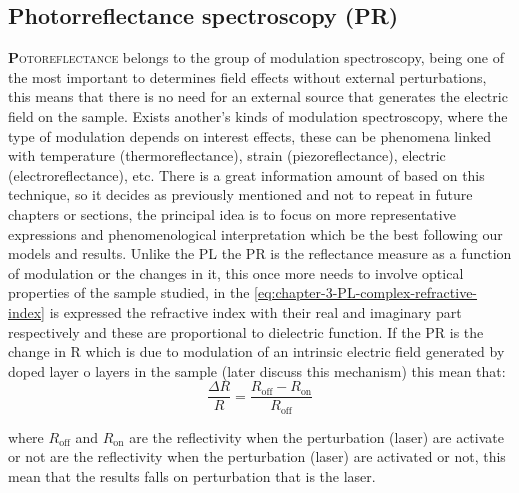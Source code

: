 \subsection{Photorreflectance spectroscopy (PR)}
\label{subsec:chapter-3-pr}
\vspace{-10mm} 
\lettrine[lines=3, lraise=.1, nindent=0mm, slope=0mm]{\textbf{P}}{otoreflectance} belongs to the group of modulation spectroscopy, being one of the most important to determines field effects without external perturbations, this means that there is no need for an external source that generates the electric field on the sample. Exists another's kinds of modulation spectroscopy, where the type of modulation depends on interest effects, these can be phenomena linked with temperature (thermoreflectance), strain (piezoreflectance), electric (electroreflectance), etc. There is a great information amount of based on this technique, so it decides as previously mentioned and not to repeat in future chapters or sections, the principal idea is to focus on more representative expressions and phenomenological interpretation which be the best following our models and results. Unlike the PL the PR is the reflectance measure as a function of modulation or the changes in it, this once more needs to involve optical properties of the sample studied, in the \cref{eq:chapter-3-PL-complex-refractive-index} is expressed the refractive index with their real and imaginary part respectively and these are proportional to dielectric function. If the PR is the change in R which is due to modulation of an intrinsic electric field generated by doped layer o layers in the sample (later discuss this mechanism) this mean that:
\begin{equation}
	\dfrac{\Delta R}{R} = \dfrac{R_{\mathrm{off}}-R_{\mathrm{on}}}{R_{\mathrm{off}}}
	\label{eq:chapter-3-PR-mechanis}
\end{equation}


where $R_{\mathrm{off}}$ and $R_{\mathrm{on}}$ are the reflectivity when the perturbation (laser) are activate or not  are the reflectivity when the perturbation (laser) are activated or not, this mean that the results  falls on perturbation that is the laser.

